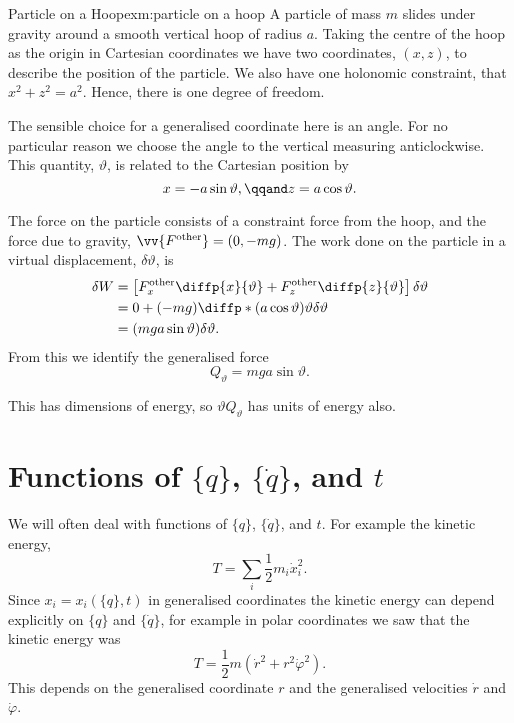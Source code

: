 \documentclass[fleqn]{NotesClass}
\newcommand*{\other}{\mathrm{other}}
\begin{document}
    \begin{exm}{Particle on a Hoop}{exm:particle on a hoop}
        A particle of mass \(m\) slides under gravity around a smooth vertical hoop of radius \(a\).
        Taking the centre of the hoop as the origin in Cartesian coordinates we have two coordinates, \((x, z)\), to describe the position of the particle.
        We also have one holonomic constraint, that \(x^2 + z^2 = a^2\).
        Hence, there is one degree of freedom.
        
        The sensible choice for a generalised coordinate here is an angle.
        For no particular reason we choose the angle to the vertical measuring anticlockwise.
        This quantity, \(\vartheta\), is related to the Cartesian position by
        \begin{equation}
            x = -a\sin\vartheta, \qqand z = a\cos\vartheta.
        \end{equation}
    
        The force on the particle consists of a constraint force from the hoop, and the force due to gravity, \(\vv{F^{\other}} = (0, -mg)\).
        The work done on the particle in a virtual displacement, \(\delta\vartheta\), is
        \begin{align}
            \delta W &= \left[ F_x^{\other} \diffp{x}{\vartheta} + F_z^{\other} \diffp{z}{\vartheta} \right]\delta\vartheta\\
            &= 0 + (-mg)\diffp*{(a\cos\vartheta)}{\vartheta}\delta\vartheta\\
            &= (mga\sin\vartheta)\delta\vartheta.
        \end{align}
        From this we identify the generalised force
        \begin{equation}
            Q_{\vartheta} = mga\sin\vartheta.
        \end{equation}
        
        This has dimensions of energy, so \(\vartheta Q_\vartheta\) has units of energy also.
    \end{exm}
    
    \section{Functions of \texorpdfstring{\(\{q\}\), \(\{\dot{q}\}\), and \(t\)}{\{q\}, \{q-dot\}, and t}}
    We will often deal with functions of \(\{q\}\), \(\{\dot{q}\}\), and \(t\).
    For example the kinetic energy,
    \begin{equation}
        T = \sum_i \frac{1}{2}m_i\dot{x}_i^2.
    \end{equation}
    Since \(x_i = x_i(\{q\}, t)\) in generalised coordinates the kinetic energy can depend explicitly on \(\{q\}\) and \(\{\dot{q}\}\), for example in polar coordinates we saw that the kinetic energy was
    \begin{equation}
        T = \frac{1}{2}m(\dot{r}^2 + r^2\dot{\varphi}^2).
    \end{equation}
    This depends on the generalised coordinate \(r\) and the generalised velocities \(\dot{r}\) and \(\dot{\varphi}\).
    
\end{document}
